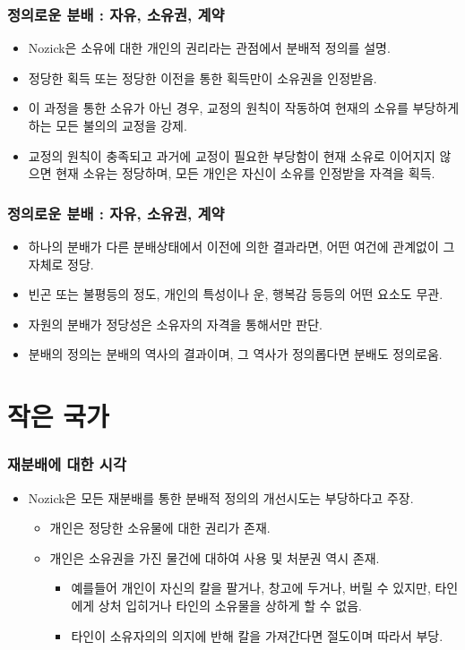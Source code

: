 \documentclass[aspectratio=169,xcolor=dvipsnames,handout]{beamer}
\begin{document}
\begin{frame}[<+->]
\frametitle{정의로운 분배 : 자유, 소유권, 계약}
    \begin{itemize}
        \item Nozick은 소유에 대한 개인의 권리라는 관점에서 분배적 정의를 설명.
        \item 정당한 획득 또는 정당한 이전을 통한 획득만이 소유권을 인정받음.
        \item 이 과정을 통한 소유가 아닌 경우, 교정의 원칙이 작동하여 현재의 소유를 부당하게 하는 모든 불의의 교정을 강제.
        \item 교정의 원칙이 충족되고 과거에 교정이 필요한 부당함이 현재 소유로 이어지지 않으면 현재 소유는 정당하며, 모든 개인은 자신이 소유를 인정받을 자격을 획득.
    \end{itemize}
\end{frame}

\begin{frame}[<+->]
\frametitle{정의로운 분배 : 자유, 소유권, 계약}
    \begin{itemize}
        \item 하나의 분배가 다른 분배상태에서 이전에 의한 결과라면, 어떤 여건에 관계없이 그 자체로 정당.
        \item 빈곤 또는 불평등의 정도, 개인의 특성이나 운, 행복감 등등의 어떤 요소도 무관.
        \item 자원의 분배가 정당성은 소유자의 자격을 통해서만 판단.
        \item 분배의 정의는 분배의 역사의 결과이며, 그 역사가 정의롭다면 분배도 정의로움.
    \end{itemize}
\end{frame}

\section{작은 국가}

\begin{frame}[<+->]
\frametitle{재분배에 대한 시각}
    \begin{itemize}
        \item Nozick은 모든 재분배를 통한 분배적 정의의 개선시도는 부당하다고 주장.
        \begin{itemize}
            \item 개인은 정당한 소유물에 대한 권리가 존재.
            \item 개인은 소유권을 가진 물건에 대하여 사용 및 처분권 역시 존재.
            \begin{itemize}
                \item 예를들어 개인이 자신의 칼을 팔거나, 창고에 두거나, 버릴 수 있지만, 타인에게 상처 입히거나 타인의 소유물을 상하게 할 수 없음.
                \item 타인이 소유자의의 의지에 반해 칼을 가져간다면 절도이며 따라서 부당.
            \end{itemize}
        \end{itemize}
    \end{itemize}
\end{frame}
\end{document}
